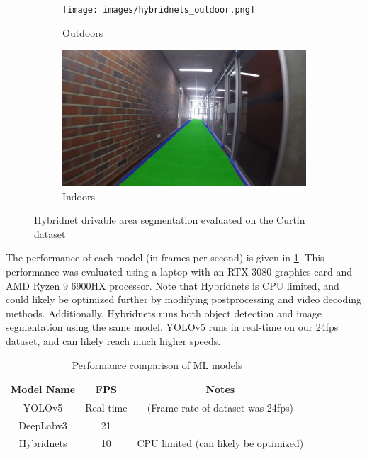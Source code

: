 \begin{figure}[H]
    \centering
    \begin{subfigure}{.48\textwidth}
        \centering
        \texttt{[image: images/hybridnets\_outdoor.png]}
        \caption{Outdoors}
    \end{subfigure}
    \quad
    \begin{subfigure}{.47\textwidth}
        \centering
        \includegraphics[width=\linewidth]{images/hybridnets_indoor.png}
        \caption{Indoors}
    \end{subfigure}
    \caption{Hybridnet drivable area segmentation evaluated on the Curtin dataset}
    \label{fig:hybridnets}
\end{figure}

The performance of each model (in frames per second) is given in \cref{table:model_fps}.
This performance was evaluated using a laptop with an RTX 3080 graphics card and AMD Ryzen 9 6900HX processor.
Note that Hybridnets is CPU limited, and could likely be optimized further by modifying postprocessing and video decoding methods.
Additionally,
Hybridnets runs both object detection and image segmentation using the same model.
YOLOv5 runs in real-time on our 24fps dataset, and can likely reach much higher speeds.

\begin{table}[H]
    \centering
    \begin{tabular}{c c c}
    \toprule
    Model Name & FPS & Notes \\
    \midrule
    YOLOv5 & Real-time & (Frame-rate of dataset was 24fps) \\
    DeepLabv3 & 21 &  \\
    Hybridnets & 10 & CPU limited (can likely be optimized) \\
    \bottomrule
    \end{tabular}
    \caption{Performance comparison of ML models}
    \label{table:model_fps}
\end{table}

